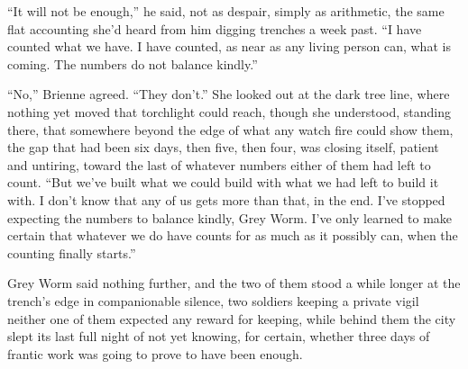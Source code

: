 “It will not be enough,” he said, not as despair, simply as arithmetic, the same flat accounting she’d heard from him digging trenches a week past. “I have counted what we have. I have counted, as near as any living person can, what is coming. The numbers do not balance kindly.”

“No,” Brienne agreed. “They don’t.” She looked out at the dark tree line, where nothing yet moved that torchlight could reach, though she understood, standing there, that somewhere beyond the edge of what any watch fire could show them, the gap that had been six days, then five, then four, was closing itself, patient and untiring, toward the last of whatever numbers either of them had left to count. “But we’ve built what we could build with what we had left to build it with. I don’t know that any of us gets more than that, in the end. I’ve stopped expecting the numbers to balance kindly, Grey Worm. I’ve only learned to make certain that whatever we do have counts for as much as it possibly can, when the counting finally starts.”

Grey Worm said nothing further, and the two of them stood a while longer at the trench’s edge in companionable silence, two soldiers keeping a private vigil neither one of them expected any reward for keeping, while behind them the city slept its last full night of not yet knowing, for certain, whether three days of frantic work was going to prove to have been enough.